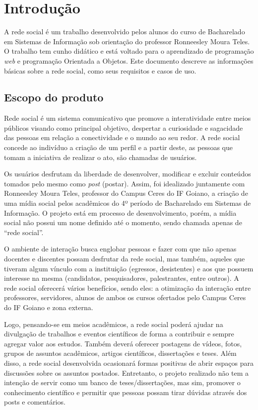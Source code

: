 \chapter{Introdução}

A rede social é um trabalho desenvolvido pelos alunos do curso de Bacharelado em Sistemas de Informação sob orientação do professor Ronneesley Moura Teles.
O trabalho tem cunho didático e está voltado para o aprendizado de programação \textit{web} e programação Orientada a Objetos.
Este documento descreve as informações básicas sobre a rede social, como seus requisitos e casos de uso.


\section{Escopo do produto}
Rede social é um sistema comunicativo que promove a interatividade entre meios públicos
visando como principal objetivo, despertar a curiosidade e sagacidade das pessoas em relação a conectividade e o mundo ao seu redor. A rede social concede ao indivíduo a criação de um perfil e a partir deste, as pessoas que tomam a iniciativa de realizar o ato, são chamadas de usuários.

Os usuários desfrutam da liberdade de desenvolver, modificar e excluir conteúdos tomados pelo mesmo como \textit{post} (postar). Assim, foi idealizado juntamente com Ronneesley Moura Teles, professor do Campus Ceres do IF Goiano, a criação de uma mídia social pelos acadêmicos do 4º período de Bacharelado em Sistemas de Informação. O projeto está em processo de desenvolvimento, porém, a mídia social não possui um nome definido até o momento, sendo chamada apenas de “rede social”.

O ambiente de interação busca englobar pessoas e fazer com que não apenas docentes e discentes possam desfrutar da rede social, mas também, aqueles que tiveram algum vínculo com a instituição (egressos, desistentes) e aos que possuem interesse na mesma (candidatos, pesquisadores, palestrantes, entre outros). A rede social oferecerá vários benefícios, sendo eles: a otimização da interação entre professores, servidores, alunos de ambos os cursos ofertados pelo Campus Ceres do IF Goiano e zona externa.

Logo, pensando-se em meios acadêmicos, a rede social poderá ajudar na divulgação de trabalhos e eventos científicos de forma a contribuir e sempre agregar valor aos estudos. Também deverá oferecer postagens de vídeos, fotos, grupos de assuntos acadêmicos, artigos científicos, dissertações e teses. Além disso, a rede social desenvolvida ocasionará formas positivas de abrir espaços para discussões sobre os assuntos postados. Entretanto, o projeto realizado não tem a intenção de servir como um banco de teses/dissertações, mas sim, promover o conhecimento científico e permitir que pessoas possam tirar dúvidas através dos posts e comentários.
  

